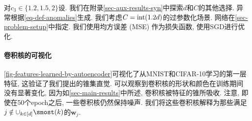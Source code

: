 对$c_3 \in \{1.2, 1.5, 2\}$设.
我们在附录\cref{sec-aux-results-syn}中探索$d$和$C$的其他选择.
异常根据\cref{eq-def-anomalies}生成. 
我们考虑$C = {\rm{int}}(1.2d)$的过参数化场景.
网络在\cref{sec-problem-setup}中指定. 
我们使用均方误差 (MSE) 作为损失函数, 使用SGD进行优化.

\paragraph{卷积核的可视化}
   
\cref{fig-features-learned-by-autoencoder}可视化了从MNIST和CIFAR-10学习的第一层特征, 这验证了我们提出的锥集直觉.
可以观察到卷积核的形状和颜色在训练期间没有显著变化, 因为如\cref{sec-main-results}中所述, 卷积核被特征的锥所吸收.
注意, 即使在50个epoch之后, 一些卷积核仍然保持噪声.
我们将这些卷积核解释为那些满足$j \notin \cup_{k\in [d]} \smost(k)$的$\boldsymbol{w}_j$.

   
   

